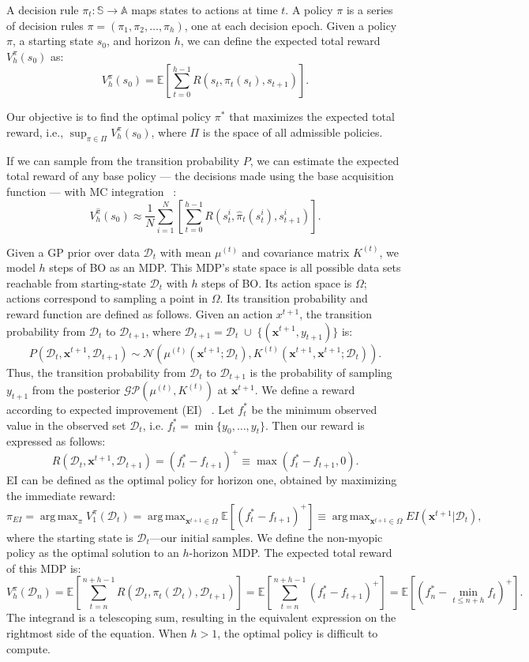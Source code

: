 \documentclass{article}
\DeclareMathOperator*{\argmax}{arg\,max}
\newcommand{\bbE}{\mathbb{E}}
\newcommand{\calD}{\mathcal{D}}
\newcommand{\bfx}{\textbf{x}}
\begin{document}
A decision rule $\pi_t : \mathbb{S} \to \mathbb{A}$ maps states to actions at time $t$. A policy 
$\pi$ is a series of decision rules $\pi = (\pi_1, \pi_2, \dots, \pi_{h})$, one at each decision 
epoch. Given a policy $\pi$, a starting state $s_0$, and horizon $h$, we can define the expected 
total reward $V_h^\pi(s_0)$ as:
\[
  V_h^\pi(s_0) = \bbE\left[ \sum_{t=0}^{h-1} R(s_t, \pi_t(s_t), s_{t+1}) \right].
\]

Our objective is to find the optimal policy 
$\pi^*$ that maximizes the expected total reward, i.e., $\sup_{\pi \in \Pi}V_h^\pi(s_0)$, where $\Pi$ 
is the space of all admissible policies.

If we can sample from the transition probability $P$, we can estimate the expected total reward of
any base policy --- the decisions made using the base acquisition function --- with MC integration ~\cite{Sutton1998}:
%
%
\[
  V_h^{\hat{\pi}}(s_0) \approx 
  \frac{1}{N}\sum_{i=1}^N\left[\sum_{t=0}^{h-1}R(s_t^i, \hat{\pi}_t(s_t^i), s^i_{t+1})\right].
\]

Given a GP prior over data $\calD_t$ with mean $\mu^{(t)}$ and covariance matrix $K^{(t)}$, we 
model $h$ steps of BO as an MDP. This MDP’s state space is all possible data sets reachable from 
starting-state $\calD_t$ with $h$ steps of BO. Its action space is $\Omega$; actions 
correspond to sampling a point in $\Omega$. Its transition probability and reward function are 
defined as follows. Given an action $x^{t+1}$, the transition probability from $\calD_t$ to 
$\calD_{t+1}$, where $\calD_{t+1} = \calD_t \;\cup\; \{(\bfx^{t+1}, 
y_{t+1})\}$ is:
\[
  P(\calD_t, \bfx^{t+1}, \calD_{t+1}) \sim 
    \mathcal{N}(\mu^{(t)}(\bfx^{t+1};\calD_t),K^{(t)}(\bfx^{t+1}, \bfx^{t+1};\calD_t)).
\]
Thus, the transition probability from $\calD_t$ to $\calD_{t+1}$ is the probability of 
sampling $y_{t+1}$ from the posterior $\mathcal{GP}(\mu^{(t)}, K^{(t)})$ at $\bfx^{t+1}$. We 
define a reward according to expected improvement (EI) ~\cite{Jones1998}. Let $f^*_t$ be 
the minimum observed value in the observed set $\calD_t$, i.e. $f^*_t = \min\{y_0, \dots, 
y_t\}$. Then our reward is expressed as follows:
\[
  R(\calD_t, \bfx^{t+1}, \calD_{t+1}) = (f^*_t-f_{t+1})^+ \equiv \max(f^*_t-f_{t+1}, 0).
\]
EI can be defined as the optimal policy for horizon one, obtained by maximizing the immediate reward:
\[
  \pi_{EI} 
  = \argmax_\pi V_1^\pi(\calD_t) 
  = \argmax_{\bfx^{t+1} \in \Omega} \bbE\left[ (f_t^*-f_{t+1})^+ \right] 
  \equiv \argmax_{\bfx^{t+1}\in\Omega} EI(\bfx^{t+1}|\calD_t),
\]
where the starting state is $\calD_t$—our initial samples. 
We define the non-myopic policy as the optimal solution to an $h$-horizon MDP. The expected total reward of this MDP is:
\[
  V_h^\pi(\calD_n) = \bbE\left[ \sum_{t=n}^{n+h-1} R(\calD_t, \pi_t(\calD_t),
  \calD_{t+1})\right] = \bbE\left[ \sum_{t=n}^{n+h-1} (f_t^* - f_{t+1})^+\right] =
    \bbE\left[ \left(f_n^* - \min_{t \leq n+h}f_{t}\right)^+\right].
\]
The integrand is a telescoping sum, resulting in the equivalent expression on the rightmost side of the equation.
When $h>1$, the optimal policy is difficult to compute.

\end{document}
